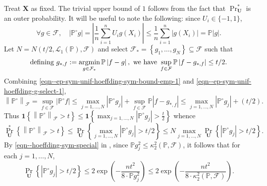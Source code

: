 Treat \(\mathbf{X}\) as fixed.
The trivial upper bound of \(1\) follows from the fact that
\(\Pr_{\mathbf{U}}^{\ast}\) is an outer probability.
It will be useful to note the following: since \(U_{i} \in \{- 1, 1\}\),
\begin{equation}
  \forall g \in \mathcal{F}, \quad \left| \mathbb{P}^{\circ} g \right| = \left|
  \frac{1}{n} \sum_{i = 1}^{n} U_{i} g \left( X_{i} \right) \right| \leq
  \frac{1}{n} \sum_{i = 1}^{n} \left| g \left( X_{i} \right) \right| =
  \mathbb{P} |g|.
  \label{eqn--ep-sym-unif-hoeffding-sym-bound-emp-1}
\end{equation}
Let \(N = N \left( t / 2, \mathscr{L}_{1} (\mathbb{P}),
\mathcal{F} \right)\) and select \(\mathcal{F}_{\ast} = \left\{ g_{1}, \dots,
g_{N} \right\} \subseteq \mathcal{F}\) such that
\begin{equation}
  \text{defining } g_{\ast, f} := \operatorname*{argmin}_{g \in \mathcal{F}_{\ast}}
  \mathbb{P} \left| f - g \right|, \text{ we have } \sup_{f \in \mathcal{F}}
  \mathbb{P} \left| f - g_{\ast, f} \right| \leq t / 2.
  \label{eqn--ep-sym-unif-hoeffding-g-select-1}
\end{equation}
Combining \eqref{eqn--ep-sym-unif-hoeffding-sym-bound-emp-1} and
\eqref{eqn--ep-sym-unif-hoeffding-g-select-1},
\begin{equation*}
  \left\| \mathbb{P}^{\circ} \right\|_{\mathcal{F}} = \sup_{f \in \mathcal{F}}
  \left| \mathbb{P}^{\circ} f \right| \leq \max_{j = 1, \dots, N} \left|
  \mathbb{P}^{\circ} g_{j} \right| + \sup_{f \in \mathcal{F}} \mathbb{P} \left|
  f - g_{\ast, f} \right| \leq \max_{j = 1, \dots, N} \left| \mathbb{P}^{\circ}
  g_{j} \right| + (t / 2).
\end{equation*}
Thus \(\mathbf{1} \left\{ \left\| \mathbb{P}^{\circ} \right\|_{\mathcal{F}} > t
\right\} \leq \mathbf{1} \left\{ \max_{j = 1, \dots, N} \left|
\mathbb{P}^{\circ} g_{j} \right| > \frac{t}{2} \right\}\) whence
\begin{equation*}
  \Pr_{\mathbf{U}}^{\ast} \left\{ \left\| \mathbb{P}^{\circ}
  \right\|_{\mathcal{F}} > t \right\} \leq \Pr_{\mathbf{U}} \left\{ \max_{j = 1,
  \dots, N} \left| \mathbb{P}^{\circ} g_{j} \right| > t / 2 \right\} \leq
  N \max_{j = 1, \dots, N} \Pr_{\mathbf{U}} \left\{ \left| \mathbb{P}^{\circ}
  g_{j} \right| > t / 2 \right\}.
\end{equation*}
By \eqref{eqn--hoeffding-sym-special} in ,
since \(\mathbb{P} g_{j}^{2} \leq \kappa_{2}^{2} (\mathbb{P}, \mathcal{F})\), it
follows that for each \(j = 1, \dots, N\),
\begin{equation*}
  \Pr_{\mathbf{U}} \left\{ \left| \mathbb{P}^{\circ} g_{j} \right| > t / 2
  \right\} \leq 2 \exp \left( - \frac{n t^{2}}{8 \cdot \mathbb{P} g_{j}^{2}}
  \right) \leq 2 \exp \left( - \frac{n t^{2}}{8 \cdot \kappa_{2}^{2}
  (\mathbb{P}, \mathcal{F})} \right).
\end{equation*}
